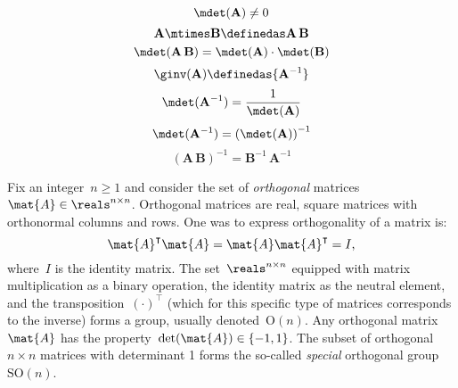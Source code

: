 \begin{forslides}
\begin{equation} \label{eq:group-fullrank-isfullrank}
   \mdet(\mathbf{A}) \neq 0
\end{equation}
\begin{equation} \label{eq:group-fullrank-composition}
   \mathbf{A} \mtimes \mathbf{B}  \definedas \mathbf{A}\,\mathbf{B}
\end{equation}
\begin{equation} \label{eq:group-fullrank-composition-det}
   \mdet(\mathbf{A} \, \mathbf{B}) = \mdet(\mathbf{A}) \cdot  \mdet(\mathbf{B})
\end{equation}
\begin{equation} \label{eq:group-fullrank-inverse}
   \ginv(\mathbf{A}) \definedas {\mathbf{A}^{-1}}
\end{equation}
\begin{equation} \label{eq:group-fullrank-inverse-det}
   \mdet(\mathbf{A}^{-1}) = \frac{1}{\mdet(\mathbf{A})}
\end{equation}
\begin{equation} \label{eq:group-fullrank-inverse-det2}
   \mdet(\mathbf{A}^{-1}) = \left( \mdet(\mathbf{A}) \right) ^ {-1}
\end{equation}
\begin{equation} \label{eq:group-fullrank-inverse-comp}
   (\mathbf{A}\,\mathbf{B})^{-1} = {\mathbf{B}^{-1} \, \mathbf{A}^{-1}}
\end{equation}
\end{forslides}



\begin{example}
Fix an integer~$n\geq 1$ and consider the set of \emph{orthogonal} matrices~$\mat{A}\in \reals^{n\times n}$. Orthogonal matrices are real, square matrices with orthonormal columns and rows. One was to express orthogonality of a matrix is:
    \begin{equation*}
        \mat{A}^\intercal \mat{A}=\mat{A}\mat{A}^\intercal = I,
\end{equation*}
    where~$I$ is the identity matrix. The set~$\reals^{n\times n}$ equipped with matrix multiplication as a binary operation, the identity matrix as the neutral element, and the transposition~$(\cdot)^\intercal$ (which for this specific type of matrices corresponds to the inverse) forms a group, usually denoted~$\text{O}(n)$.
Any orthogonal matrix~$\mat{A}$ has the property~$\det(\mat{A})\in \{-1,1\}$. The subset of orthogonal~$n\times n$ matrices with determinant 1 forms the so-called \emph{special} orthogonal group~$\text{SO}(n)$.
\end{example}

